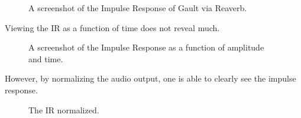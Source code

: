 \begin{figure}[h] %
	\begin{center}
		\caption{A screenshot of the Impulse Response of Gault via Reaverb.}
	\end{center}
\end{figure}

Viewing the IR as a function of time does not reveal much.

\begin{figure}[h] %
	\begin{center}
		\caption{A screenshot of the Impulse Response as a function of amplitude and time.}
	\end{center}
\end{figure}

However, by normalizing the audio output, one is able to clearly see the impulse response.

\begin{figure}[h] %
	\begin{center}
		\caption{The IR normalized.}
	\end{center}
\end{figure}

